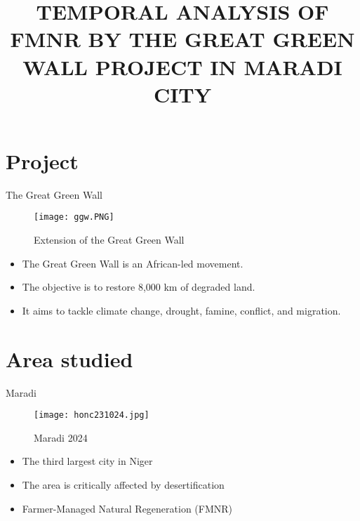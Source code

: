 \documentclass{beamer}
\title{\small TEMPORAL ANALYSIS OF FMNR BY THE GREAT GREEN WALL PROJECT IN MARADI CITY}
\institute{
\vspace{-1cm}
\begin{figure}
            \centering
            \texttt{[image: maradi1.PNG]}
            \label{fig:enter-label}
        \end{figure}
       \\Andrea Petrone
       \\A.Y. 2024-2025
    }
\date{}
\begin{document}
\maketitle


\section{Project}

\begin{frame}{The Great Green Wall}
\begin{figure}
    \centering
    \texttt{[image: ggw.PNG]}
    \caption{Extension of the Great Green Wall}
    \label{fig:enter-label}
\end{figure}
\vspace{-0.4cm}
     \begin{itemize}
        \item The Great Green Wall is an African-led movement.
        \item The objective is to restore 8,000 km of degraded land.
        \item It aims to tackle climate change, drought, famine, conflict, and migration.
    \end{itemize}    
\end{frame}

\section{Area studied}

\begin{frame}{Maradi}
       \begin{figure}
    \centering
    \texttt{[image: honc231024.jpg]}
\vspace{-0.3cm}
    \caption{Maradi 2024}
    \label{fig:enter-label}
\end{figure}

\vspace{-0.5cm}
    
\begin{itemize}
    \item The third largest city in Niger
    \item The area is critically affected by desertification
    \item Farmer-Managed Natural Regeneration (FMNR) 
\end{itemize}
    
\end{frame}
\end{document}
